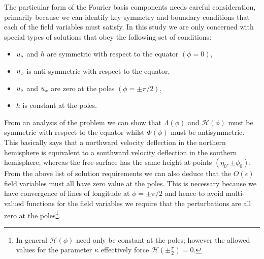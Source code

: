The particular form of the Fourier basis components needs careful consideration, primarily  because we can identify key symmetry and boundary conditions that each of the field variables must satisfy. In this study we are only concerned with special types of solutions that obey the following set of conditions:
\begin{itemize}
\item ${u_{\scriptscriptstyle \lambda}}$ and $h$ are symmetric with respect to the equator $(\phi=0)$,
\item ${u_{\scriptscriptstyle \phi}}$ is anti-symmetric with respect to the equator,
\item ${u_{\scriptscriptstyle \lambda}}$ and ${u_{\scriptscriptstyle \phi}}$ are zero at the poles $(\phi=\pm\pi/2)$,
\item $h$ is constant at the poles.
\end{itemize}
From an analysis of the problem we can show that $\Lambda(\phi)$ and $\mathcal{H}(\phi)$ must be symmetric with respect to the equator whilst $\Phi(\phi)$ must be antisymmetric. This basically says that a northward velocity deflection in the northern hemisphere is equivalent to a southward velocity deflection in the southern hemisphere, whereas the free-surface has the same height at points $(\eta_0,\pm\phi_0)$. From the above list of solution requirements we can also deduce that the $O(\epsilon)$ field variables must all have zero value at the poles. This is necessary because we have convergence of lines of longitude at $\phi=\pm\pi/2$ and hence to avoid multi-valued functions for the field variables we require that the perturbations are all zero at the poles\footnote{In general $\mathcal{H}(\phi)$ need only be constant at the poles; however the allowed values for the parameter $\kappa$ effectively force $\mathcal{H}\left(\pm \frac{\pi}{2}\right)=0$.}.

